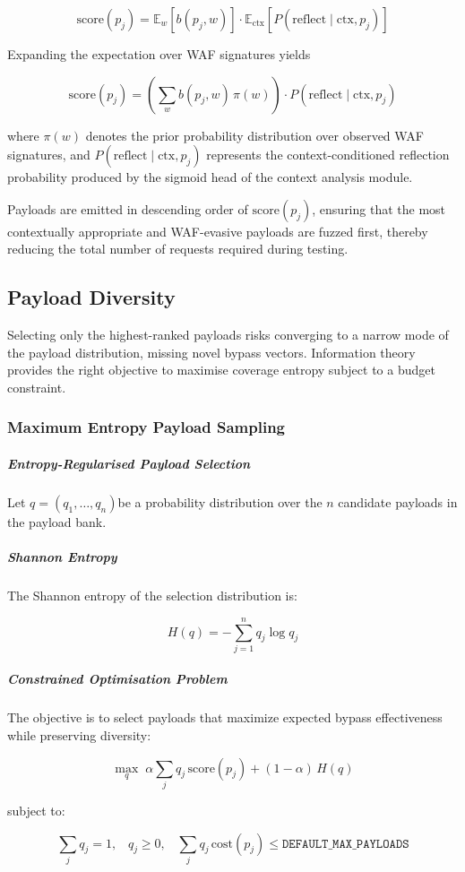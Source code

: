 \[
\mathrm{score}(p_j)
=
\mathbb{E}_{w}\!\left[b(p_j,w)\right]
\cdot
\mathbb{E}_{\mathrm{ctx}}
\!\left[
P(\mathrm{reflect}\mid \mathrm{ctx}, p_j)
\right]
\]

Expanding the expectation over WAF signatures yields

\[
\mathrm{score}(p_j)
=
\left(
\sum_{w}
b(p_j,w)\,\pi(w)
\right)
\cdot
P(\mathrm{reflect}\mid \mathrm{ctx}, p_j)
\]

where $\pi(w)$ denotes the prior probability distribution over observed WAF signatures, and $P(\mathrm{reflect}\mid \mathrm{ctx}, p_j)$ represents the context-conditioned reflection probability produced by the sigmoid head of the context analysis module.

Payloads are emitted in descending order of
\(\mathrm{score}(p_j)\), ensuring that the most contextually appropriate and WAF-evasive
payloads are fuzzed first, thereby reducing the total number of requests required during
testing.
\subsection{Payload Diversity}
Selecting only the highest-ranked payloads risks converging to a narrow mode of the payload distribution, missing novel bypass vectors. Information theory provides the right objective to maximise coverage entropy subject to a budget constraint.
\subsubsection{Maximum Entropy Payload Sampling}

\subparagraph*{Entropy-Regularised Payload Selection}

Let
$q = (q_1, \dots, q_n) $be a probability distribution over the \(n\) candidate payloads in the payload bank.

\subparagraph*{Shannon Entropy}

The Shannon entropy of the selection distribution is:

\[
H(q)
=
-
\sum_{j=1}^{n}
q_j \log q_j
\]

\subparagraph*{Constrained Optimisation Problem}

The objective is to select payloads that maximize expected bypass effectiveness while preserving diversity:

\[
\max_{q}
\;
\alpha
\sum_{j}
q_j \, \mathrm{score}(p_j)
+
(1-\alpha)\, H(q)
\]

subject to:

\[
\sum_{j} q_j = 1 \text{,}
\quad
q_j \ge 0 \text{,}
\quad
\sum_{j}
q_j \, \mathrm{cost}(p_j)
\le
\texttt{DEFAULT\_MAX\_PAYLOADS}
\]

